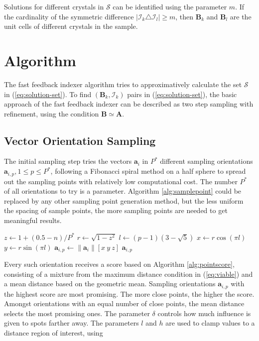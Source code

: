 \documentclass[a4paper,10pt]{article}
\newcommand{\vect}[1]{\mathbf{#1}}
\newcommand{\mat}[1]{\mathbf{#1}}
\begin{document}
Solutions for different crystals in $\mathcal{S}$ can be identified using the parameter $m$. If the cardinality of the symmetric difference $|\mathcal{I}_k \triangle \mathcal{I}_l | \geq m$, then $\mat{B}_k$ and $\mat{B}_l$ are the unit cells of different crystals in the sample.

\section{Algorithm}

The fast feedback indexer algorithm tries to approximatively calculate the set $\mathcal{S}$ in (\ref{eq:solution-set}). To find $(\mat{B}_k,\mathcal{I}_k)$ pairs in (\ref{eq:solution-set}), the basic approach of the fast feedback indexer can be described as two step sampling with refinement, using the condition $\mat{B} \simeq \mat{A}$.

\subsection{Vector Orientation Sampling}\label{subsec:vecsampling}
The initial sampling step tries the vectors $\vect{a}_i$ in $P^*$ different sampling orientations $\vect{a}_{i,p}, 1\leq p\leq P^*$, following a Fibonacci spiral method \cite{gonzales} on a half sphere to spread out the sampling points with relatively low computational cost. The number $P^*$ of all orientations to try is a parameter. Algorithm \ref{alg:samplepoint} could be replaced by any other sampling point generation method, but the less uniform the spacing of sample points, the more sampling points are needed to get meaningful results.

\begin{algorithm}
\caption{Vector orientation sampling point generation}
\label{alg:samplepoint}
\begin{algorithmic}[1]
\Function{sample-point}{$\vect{a}_i,p,P^*$}
\State $z\gets 1 + (0.5 - n)/P^*$
\State $r\gets \sqrt{1 - z^2}$
\State $l\gets (p - 1)(3 - \sqrt{5})$
\State $x\gets r \cos(\pi l)$
\State $y\gets r \sin(\pi l)$
\State $\vect{a}_{i,p}\gets \|\vect{a}_i\| [x\ y\ z]$
\State \Return $\vect{a}_{i,p}$
\EndFunction
\end{algorithmic}
\end{algorithm}

Every such orientation receives a score based on Algorithm \ref{alg:pointscore}, consisting of a mixture from the maximum distance condition in (\ref{eq:viable}) and a mean distance based on the geometric mean. Sampling orientations $\vect{a}_{i,p}$ with the highest score are most promising. The more close points, the higher the score. Amongst orientations with an equal number of close points, the mean distance selects the most promising ones. The parameter $\delta$ controls how much influence is given to spots farther away. The parameters $l$ and $h$ are used to clamp values to a distance region of interest, using
\end{document}
